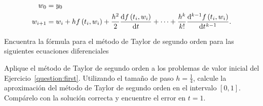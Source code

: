 \begin{align*}
    w_{0}   & =y_{0}  \\
    w_{i+1} & =w_{i}+
    h
    f\left(t_{i},w_{i}\right)+
    \frac{h^{2}}{2}
    \diff{f\left(t_{i},w_{i}\right)}{t}+
    \cdots+
    \frac{h^{k}}{k!}
    \diff[k-1]{f\left(t_{i},w_{i}\right)}{t}.
\end{align*}

\begin{questions}
    \question

    Encuentra la fórmula para el método de Taylor de segundo orden
    para las siguientes ecuaciones diferenciales

    \begin{multicols}{4}
    \end{multicols}

    \question

    Aplique el método de Taylor de segundo orden a los problemas de
    valor inicial del Ejercicio~\ref{question:first}.
    Utilizando el tamaño de paso $h=\frac{1}{4}$, calcule la
    aproximación del método de Taylor de segundo orden en el
    intervalo $\left[0,1\right]$.
    Compárelo con la solución correcta y encuentre el error en $t=1$.
\end{questions}

